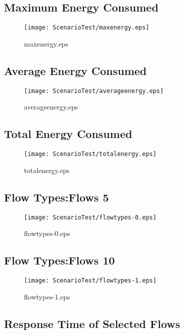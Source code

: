 \documentclass{elsart}
\begin{document}
\clearpage
\subsection{Maximum Energy Consumed}

\begin{figure}[ht]
\centering
\texttt{[image: ScenarioTest/maxenergy.eps]}
\caption{maxenergy.eps}\label{fig:maxenergy}
\end{figure}

\clearpage
\subsection{Average Energy Consumed}

\begin{figure}[ht]
\centering
\texttt{[image: ScenarioTest/averageenergy.eps]}
\caption{averageenergy.eps}\label{fig:averageenergy}
\end{figure}

\clearpage
\subsection{Total Energy Consumed}

\begin{figure}[ht]
\centering
\texttt{[image: ScenarioTest/totalenergy.eps]}
\caption{totalenergy.eps}\label{fig:totalenergy}
\end{figure}

\clearpage
\subsection{Flow Types:Flows 5}

\begin{figure}[ht]
\centering
\texttt{[image: ScenarioTest/flowtypes-0.eps]}
\caption{flowtypes-0.eps}\label{fig:flowtypes-0}
\end{figure}

\clearpage
\subsection{Flow Types:Flows 10}

\begin{figure}[ht]
\centering
\texttt{[image: ScenarioTest/flowtypes-1.eps]}
\caption{flowtypes-1.eps}\label{fig:flowtypes-1}
\end{figure}

\clearpage
\subsection{Response Time of Selected Flows}
\end{document}
